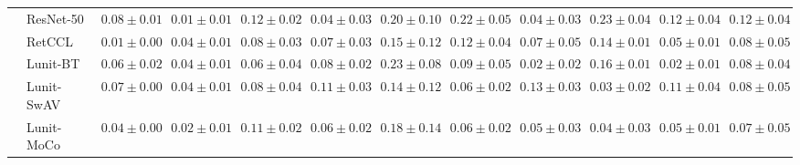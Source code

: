 \begin{tabular}{ll|cccc|c|cccc|c}
 & ResNet-50 & $0.08 \pm 0.01$ & $\mathbf{0.01 \pm 0.01}$ & $0.12 \pm 0.02$ & $0.04 \pm 0.03$ & $0.20 \pm 0.10$ & $0.22 \pm 0.05$ & $0.04 \pm 0.03$ & $0.23 \pm 0.04$ & $0.12 \pm 0.04$ & $0.12 \pm 0.04$ \\
 & RetCCL & $0.01 \pm 0.00$ & $0.04 \pm 0.01$ & $0.08 \pm 0.03$ & $0.07 \pm 0.03$ & $0.15 \pm 0.12$ & $0.12 \pm 0.04$ & $0.07 \pm 0.05$ & $0.14 \pm 0.01$ & $0.05 \pm 0.01$ & $0.08 \pm 0.05$ \\
 & Lunit-BT & $0.06 \pm 0.02$ & $0.04 \pm 0.01$ & $0.06 \pm 0.04$ & $0.08 \pm 0.02$ & $0.23 \pm 0.08$ & $0.09 \pm 0.05$ & $0.02 \pm 0.02$ & $0.16 \pm 0.01$ & $0.02 \pm 0.01$ & $0.08 \pm 0.04$ \\
 & Lunit-SwAV & $0.07 \pm 0.00$ & $0.04 \pm 0.01$ & $0.08 \pm 0.04$ & $0.11 \pm 0.03$ & $0.14 \pm 0.12$ & $0.06 \pm 0.02$ & $0.13 \pm 0.03$ & $0.03 \pm 0.02$ & $0.11 \pm 0.04$ & $0.08 \pm 0.05$ \\
 & Lunit-MoCo & $0.04 \pm 0.00$ & $0.02 \pm 0.01$ & $0.11 \pm 0.02$ & $0.06 \pm 0.02$ & $0.18 \pm 0.14$ & $0.06 \pm 0.02$ & $0.05 \pm 0.03$ & $0.04 \pm 0.03$ & $0.05 \pm 0.01$ & $0.07 \pm 0.05$ \\
\cline{1-12}
\bottomrule
\end{tabular}
